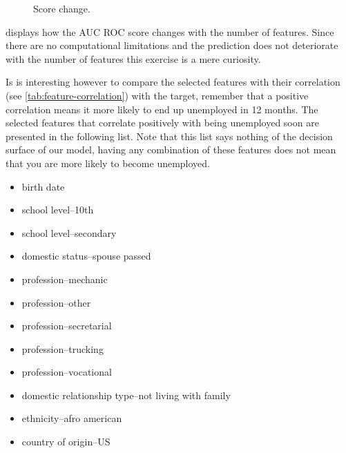 \begin{figure}[!h]
    \caption{Score change.}
    \label{fig:score-features}
    \centering
    
\end{figure}


 displays how the AUC ROC score changes with  the number of features.
Since there are no computational limitations and the prediction does not
deteriorate with the number of features this exercise is a mere curiosity.

Is is interesting however to compare the selected features with their
correlation (see \vref{tab:feature-correlation}) with the target,
remember that a positive correlation means it more likely to end up
unemployed in 12 months.
The selected features that correlate positively with being unemployed
soon are presented in the following list.
Note that this list says nothing of the decision surface of our model,
having any combination of these features does not mean that you are
more likely to become unemployed.
\begin{itemize}
    \item birth date
    \item school level--10th
    \item school level--secondary
    \item domestic status--spouse passed
    \item profession--mechanic
    \item profession--other
    \item profession--secretarial
    \item profession--trucking
    \item profession--vocational
    \item domestic relationship type--not living with family
    \item ethnicity--afro american
    \item country of origin--US
\end{itemize}


